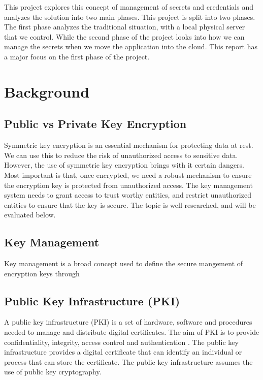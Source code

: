 \documentclass[11pt, a4paper, twoside, openany, notitlepage]{report}
\begin{document}
This project explores this concept of management of secrets and credentials and analyzes the solution into two main phases. This project is split into two phases. The first phase analyzes the traditional situation, with a local physical server that we control. While the second phase of the project looks into how we can manage the secrets when we move the application into the cloud. This report has a major focus on the first phase of the project.

\section{Background}

\subsection{Public vs Private Key Encryption}
Symmetric key encryption is an essential mechanism for protecting data at rest. We can use this to reduce the risk of unauthorized access to sensitive data. However, the use of symmetric key encryption brings with it certain dangers. Most important is that, once encrypted, we need a robust mechanism to ensure the encryption key is protected from unauthorized access. The key management system needs to grant access to trust worthy entities, and restrict unauthorized entities to ensure that the key is secure. The topic is well researched, and will be evaluated below. \\


\subsection{Key Management}
Key management is a broad concept used to define the secure mangement of encryption keys through


\subsection{Public Key Infrastructure (PKI)}
A public key infrastructure (PKI) is a set of hardware, software and procedures needed to manage and distribute digital certificates. The aim of PKI is to provide confidentiality, integrity, access control and authentication \cite{PKI:Online}.    The public key infrastructure provides a digital certificate that can identify an individual or process that can store the certificate. The public key infrastructure assumes the use of public key cryptography. 
\end{document}

